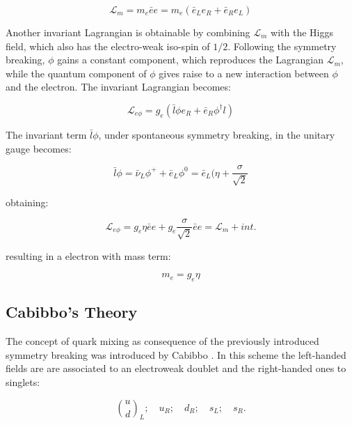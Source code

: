 \begin{equation}
\mathcal{L}_{m} = m_{e}\bar{e}e = m_{e}(\bar{e}_{L}e_{R} + \bar{e}_{R}e_{L})
\end{equation}

Another invariant Lagrangian is obtainable by combining $\mathcal{L}_{m}$ with the Higgs field, which also has the electro-weak iso-spin of $1/2$. Following the symmetry breaking, $\phi$ gains a constant component, which reproduces the Lagrangian  $\mathcal{L}_{m}$, while the quantum component of $\phi$ gives raise to a new interaction between $\phi$ and the electron. The invariant Lagrangian becomes:

\begin{equation}
\mathcal{L}_{e\phi} = g_{e} (\bar{l}\phi e_{R} + \bar{e}_{R}\phi^{\dagger}l)
\end{equation}

The invariant term $\bar{l}\phi$, under spontaneous symmetry breaking, in the unitary gauge becomes:

\begin{equation}
\bar{l}\phi = \bar{\nu}_{L}\phi^{+} + \bar{e}_{L}\phi^{0} = \bar{e}_{L}(\eta + \dfrac{\sigma}{\sqrt{2}}
\end{equation}

obtaining:

\begin{equation}
\mathcal{L}_{e\phi} = g_{e}\eta\bar{e}e + g_{e} \dfrac{\sigma}{\sqrt{2}}\bar{e}e = \mathcal{L}_{m} + int.
\end{equation}

resulting in a electron with mass term:

\begin{equation}
m_{e} = g_{e}\eta
\end{equation}

\subsection{Cabibbo's Theory}

The concept of quark mixing as consequence of the previously introduced symmetry breaking was introduced by Cabibbo \cite{PhysRevLett.10.531}. In this scheme the left-handed fields are are associated to an electroweak doublet and the right-handed ones to singlets:

\begin{equation}
\binom{u}{d}_{L}; \quad u_{R}; \quad d_{R}; \quad s_{L}; \quad s_{R}.
\end{equation}

